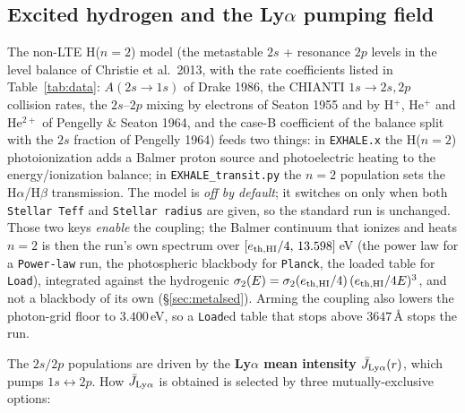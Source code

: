\documentclass[english,a4paper]{my_memo}
\begin{document}
\subsection{Excited hydrogen and the \texorpdfstring{Ly$\alpha$}{Ly-alpha} pumping field}\label{sec:excitedH}
\label{sec:jlya}
The non-LTE H($n{=}2$) model (the metastable $2s$ + resonance $2p$ levels in
the level balance of Christie et al.\ 2013, with the rate coefficients listed in
Table~\ref{tab:data}: $A(2s\to1s)$ of Drake 1986, the CHIANTI $1s\to2s,2p$
collision rates, the $2s$--$2p$ mixing by electrons of Seaton 1955 and by
H$^+$, He$^+$ and He$^{2+}$ of Pengelly \& Seaton 1964, and the case-B
coefficient of the balance split with the $2s$ fraction of Pengelly 1964)
feeds two things: in \texttt{EXHALE.x} the H($n{=}2$)
photoionization adds a Balmer proton source and photoelectric heating to the
energy/ionization balance; in \texttt{EXHALE\_transit.py} the $n{=}2$ population sets the
H$\alpha$/H$\beta$ transmission. The model is \emph{off by default}; it switches
on only when both \texttt{Stellar Teff} and \texttt{Stellar radius} are given, so
the standard run is unchanged. Those two keys \emph{enable} the coupling; the
Balmer continuum that ionizes and heats $n{=}2$ is then the run's own spectrum
over $[e_{\rm th,HI}/4,\,13.598]$\,eV (the power law for a
\texttt{Power-law} run, the photospheric blackbody for \texttt{Planck}, the
loaded table for \texttt{Load}), integrated against the hydrogenic
$\sigma_2(E)=\sigma_2(e_{\rm th,HI}/4)\,(e_{\rm th,HI}/4E)^3$, and not a
blackbody of its own (\S\ref{sec:metalsed}). Arming the coupling also lowers
the photon-grid floor to $3.400$\,eV, so a \texttt{Load}ed table that stops
above $3647$\,\AA{} stops the run.

The $2s/2p$ populations are driven by the \textbf{Ly$\alpha$ mean intensity}
$\bar J_{\rm Ly\alpha}(r)$, which pumps $1s\!\leftrightarrow\!2p$. How
$\bar J_{\rm Ly\alpha}$ is obtained is selected by three mutually-exclusive
options:
\end{document}
